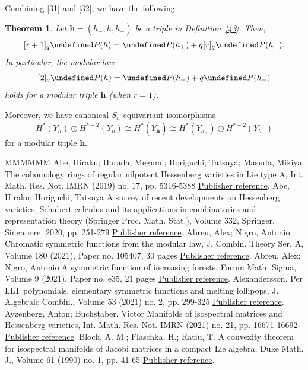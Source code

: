 \documentclass[11pt]{article}
\newtheorem{theorem}[theo]{Theorem}
\theoremstyle{definition}
\numberwithin{equation}{section}
\let\cal\undefined
\numberwithin{equation}{section}
\newcommand{\cal}{\mathcal}
\newcommand\cP{{\cal P}}
\newcommand\tY{{\widetilde{Y}}}
\newcommand\beq{\begin{equation}}
\newcommand\eeq{\end{equation}}
\newcommand\bh{\mathbf{h}}
\begin{document}
Combining \eqref{31} and \eqref{32}, we have the following. 

\begin{theorem} \label{2}
	Let $\bh=(h_-,h,h_+)$ be a triple in Definition~\ref{43}. Then, 
	\[[r+1]_q \cP(h)=\cP(h_+)+q[r]_q \cP(h_-).\]
	In particular, the modular law
	\beq \label{53} [2]_q\cP(h)=\cP(h_+)+q\cP(h_-) \eeq
	holds for a modular triple $\bh$ (when $r=1$).
\end{theorem}

Moreover, we have canonical $S_n$-equivariant isomorphisms
\beq \label{n43} H^*(Y_h)\oplus H^{*-2}(Y_h)\cong H^*(\tY_\bh)\cong 
H^*(Y_{h_+})\oplus H^{*-2}(Y_{h_-})\eeq
for a modular triple $\bh$.


\begin{thebibliography}{MMMMMM}
 Abe, Hiraku; Harada, Megumi; Horiguchi, Tatsuya; Masuda, Mikiya The cohomology rings of regular nilpotent Hessenberg varieties in Lie type A, Int. Math. Res. Not. IMRN (2019) no. 17, pp. 5316-5388 \href{https://alco.centre-mersenne.org/articles/10.5802/alco.349/#AHHM}{Publisher reference}.
 Abe, Hiraku; Horiguchi, Tatsuya A survey of recent developments on Hessenberg varieties, Schubert calculus and its applications in combinatorics and representation theory (Springer Proc. Math. Stat.), Volume 332, Springer, Singapore, 2020, pp. 251-279 \href{https://alco.centre-mersenne.org/articles/10.5802/alco.349/#AH}{Publisher reference}.
 Abreu, Alex; Nigro, Antonio Chromatic symmetric functions from the modular law, J. Combin. Theory Ser. A, Volume 180 (2021), Paper no. 105407, 30 pages \href{https://alco.centre-mersenne.org/articles/10.5802/alco.349/#AN}{Publisher reference}.
 Abreu, Alex; Nigro, Antonio A symmetric function of increasing forests, Forum Math. Sigma, Volume 9 (2021), Paper no. e35, 21 pages \href{https://alco.centre-mersenne.org/articles/10.5802/alco.349/#AN2}{Publisher reference}.
 Alexandersson, Per LLT polynomials, elementary symmetric functions and melting lollipops, J. Algebraic Combin., Volume 53 (2021) no. 2, pp. 299-325 \href{https://alco.centre-mersenne.org/articles/10.5802/alco.349/#Ale}{Publisher reference}.
 Ayzenberg, Anton; Buchstaber, Victor Manifolds of isospectral matrices and Hessenberg varieties, Int. Math. Res. Not. IMRN (2021) no. 21, pp. 16671-16692 \href{https://alco.centre-mersenne.org/articles/10.5802/alco.349/#AB}{Publisher reference}.
 Bloch, A. M.; Flaschka, H.; Ratiu, T. A convexity theorem for isospectral manifolds of Jacobi matrices in a compact Lie algebra, Duke Math. J., Volume 61 (1990) no. 1, pp. 41-65 \href{https://alco.centre-mersenne.org/articles/10.5802/alco.349/#BFR}{Publisher reference}.

\end{thebibliography}
\end{document}
